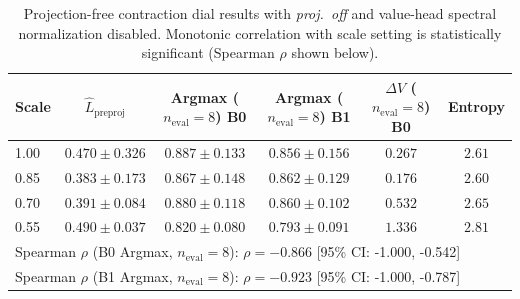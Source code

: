 \begin{table}[t]
\centering
\scriptsize
\caption{Projection-free contraction dial results with \emph{proj.\ off} and value-head spectral normalization disabled. Monotonic correlation with scale setting is statistically significant (Spearman $\rho$ shown below).}
\label{tab:exp4_projection_free_dial_v2}
\begin{tabular}{lccccc}
\toprule
Scale & $\hat{L}_{\text{preproj}}$ & Argmax ($n_{\mathrm{eval}}{=}8$) B0 & Argmax ($n_{\mathrm{eval}}{=}8$) B1 & $\Delta V$ ($n_{\mathrm{eval}}{=}8$) B0 & Entropy \\
\midrule
1.00 & $0.470 \pm 0.326$ & $0.887 \pm 0.133$ & $0.856 \pm 0.156$ & $0.267$ & $2.61$ \\
0.85 & $0.383 \pm 0.173$ & $0.867 \pm 0.148$ & $0.862 \pm 0.129$ & $0.176$ & $2.60$ \\
0.70 & $0.391 \pm 0.084$ & $0.880 \pm 0.118$ & $0.860 \pm 0.102$ & $0.532$ & $2.65$ \\
0.55 & $0.490 \pm 0.037$ & $0.820 \pm 0.080$ & $0.793 \pm 0.091$ & $1.336$ & $2.81$ \\
\midrule
\multicolumn{6}{l}{\small Spearman $\rho$ (B0 Argmax, $n_{\mathrm{eval}}{=}8$): $\rho=-0.866$ [95\% CI: -1.000, -0.542]} \\
\multicolumn{6}{l}{\small Spearman $\rho$ (B1 Argmax, $n_{\mathrm{eval}}{=}8$): $\rho=-0.923$ [95\% CI: -1.000, -0.787]} \\
\bottomrule
\end{tabular}
\end{table}
